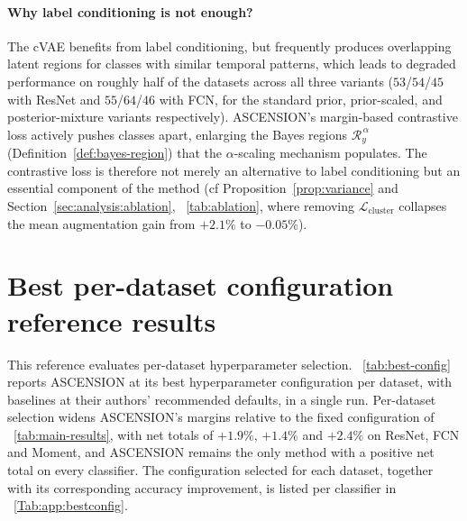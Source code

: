 \paragraph{Why label conditioning is not enough?}
The cVAE benefits from label conditioning, but frequently
produces overlapping latent regions for classes with similar
temporal patterns, which leads to degraded performance on roughly
half of the datasets across all three variants ($53$/$54$/$45$
with ResNet and $55$/$64$/$46$ with FCN, for the standard prior,
prior-scaled, and posterior-mixture variants respectively).
ASCENSION's margin-based contrastive
loss actively pushes classes apart, enlarging the Bayes regions
$\mathcal{R}_y^{\,\alpha}$ (Definition~\ref{def:bayes-region})
that the $\alpha$-scaling mechanism populates. The contrastive
loss is therefore not merely an alternative to label conditioning
but an essential component of the method (cf Proposition~\ref{prop:variance}  and
Section~\ref{sec:analysis:ablation},
\tablename~\ref{tab:ablation}, where removing $\mathcal{L}_{\text{cluster}}$
collapses the mean augmentation gain from $+2.1\%$ to $-0.05\%$).



\section{Best per-dataset configuration reference results}
\label{app:best-config}
\label{app:single-config}

This reference evaluates per-dataset hyperparameter selection.
\tablename~\ref{tab:best-config} reports ASCENSION
at its best hyperparameter configuration per dataset, with baselines at
their authors' recommended defaults, in a single run.
Per-dataset selection widens ASCENSION's margins
relative to the fixed configuration of
\tablename~\ref{tab:main-results}, with net totals of $+1.9\%$,
$+1.4\%$ and $+2.4\%$ on ResNet, FCN and Moment, and ASCENSION remains
the only method with a positive net total on every classifier.
The configuration selected for each dataset, together with its
corresponding accuracy improvement, is listed per classifier in
\tablename~\ref{Tab:app:bestconfig}.


